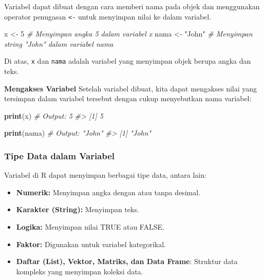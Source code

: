 \documentclass[
  oneside]{book}
\newenvironment{Shaded}{\begin{snugshade}}{\end{snugshade}}
\newcommand{\CommentTok}[1]{\textcolor[rgb]{0.56,0.35,0.01}{\textit{#1}}}
\newcommand{\DecValTok}[1]{\textcolor[rgb]{0.00,0.00,0.81}{#1}}
\newcommand{\FunctionTok}[1]{\textcolor[rgb]{0.13,0.29,0.53}{\textbf{#1}}}
\newcommand{\NormalTok}[1]{#1}
\newcommand{\OtherTok}[1]{\textcolor[rgb]{0.56,0.35,0.01}{#1}}
\newcommand{\StringTok}[1]{\textcolor[rgb]{0.31,0.60,0.02}{#1}}
\begin{document}
Variabel dapat dibuat dengan cara memberi nama pada objek dan
menggunakan operator penugasan \texttt{\textless{}-} untuk menyimpan nilai ke dalam
variabel.

\begin{Shaded}
\begin{Highlighting}[]
\NormalTok{x }\OtherTok{\textless{}{-}} \DecValTok{5}      \CommentTok{\# Menyimpan angka 5 dalam variabel x}
\NormalTok{nama }\OtherTok{\textless{}{-}} \StringTok{"John"}  \CommentTok{\# Menyimpan string "John" dalam variabel nama}
\end{Highlighting}
\end{Shaded}

Di atas, \texttt{x} dan \texttt{nama} adalah variabel yang menyimpan objek berupa
angka dan teks.

\textbf{Mengakses Variabel} Setelah variabel dibuat, kita dapat mengakses
nilai yang tersimpan dalam variabel tersebut dengan cukup menyebutkan
nama variabel:

\begin{Shaded}
\begin{Highlighting}[]
\FunctionTok{print}\NormalTok{(x)    }\CommentTok{\# Output: 5}
\CommentTok{\#\textgreater{} [1] 5}
\end{Highlighting}
\end{Shaded}

\begin{Shaded}
\begin{Highlighting}[]
\FunctionTok{print}\NormalTok{(nama) }\CommentTok{\# Output: "John"}
\CommentTok{\#\textgreater{} [1] "John"}
\end{Highlighting}
\end{Shaded}

\subsubsection*{Tipe Data dalam Variabel}\label{tipe-data-dalam-variabel}

Variabel di R dapat menyimpan berbagai tipe data, antara lain:

\begin{itemize}
\item
  \textbf{Numerik:} Menyimpan angka dengan atau tanpa desimal.
\item
  \textbf{Karakter (String):} Menyimpan teks.
\item
  \textbf{Logika:} Menyimpan nilai TRUE atau FALSE.
\item
  \textbf{Faktor:} Digunakan untuk variabel kategorikal.
\item
  \textbf{Daftar (List), Vektor, Matriks, dan Data Frame}: Struktur data
  kompleks yang menyimpan koleksi data.
\end{itemize}
\end{document}
